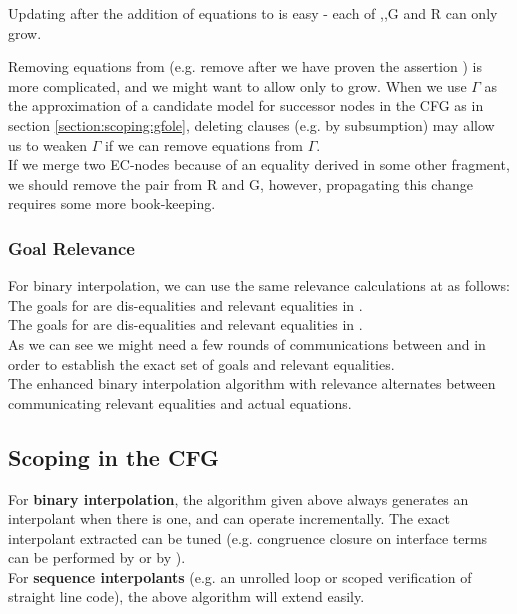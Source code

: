 Updating after the addition of equations to \m{\Gamma} is easy - each of \eqg,,G and R can only grow.

Removing equations from \m{\Gamma} (e.g. remove  after we have proven the assertion ) is more complicated, 
and we might want to allow \m{\Gamma} only to grow. When we use $\Gamma$ as the approximation of a candidate model for successor nodes in the CFG as in section \ref{section:scoping:gfole}, deleting clauses (e.g. by subsumption) may allow us to weaken $\Gamma$ if we can remove equations from $\Gamma$.\\
If we merge two EC-nodes  because of an equality derived in some other fragment, 
we should remove the pair  from R and G, however, propagating this change requires some more book-keeping.


\subsubsection*{Goal Relevance}\label{goal_relevance_CFG}
For binary interpolation, we can use the same relevance calculations at  as follows:\\
The goals for  are dis-equalities and relevant equalities in .\\
The goals for  are dis-equalities and relevant equalities in .\\
As we can see we might need a few rounds of communications between  and  in order to establish the exact set of goals and relevant equalities.\\
The enhanced binary interpolation algorithm with relevance alternates between communicating relevant equalities and actual equations.

\subsection{Scoping in the CFG}
For \textbf{binary interpolation}, the algorithm given above always generates an interpolant when there is one, and can operate incrementally. 
The exact interpolant extracted can be tuned (e.g. congruence closure on interface terms can be performed by  or by ).\\
For \textbf{sequence interpolants} (e.g. an unrolled loop or scoped verification of straight line code), the above algorithm will extend easily.

